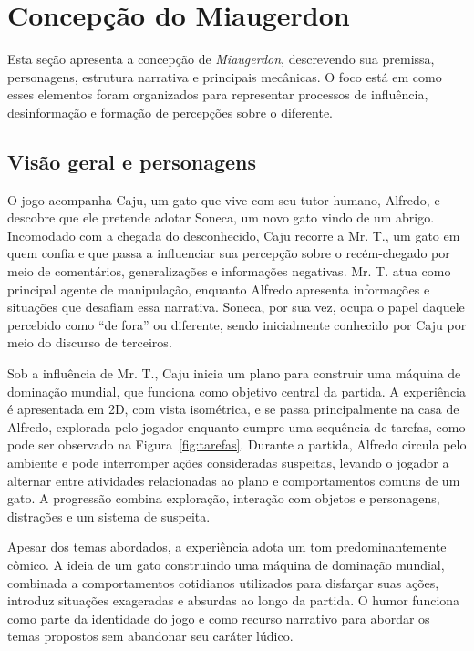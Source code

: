 \documentclass[12pt]{article}
\begin{document}
\section{Concepção do Miaugerdon}

Esta seção apresenta a concepção de \textit{Miaugerdon}, descrevendo sua premissa, personagens, estrutura narrativa e principais mecânicas. O foco está em como esses elementos foram organizados para representar processos de influência, desinformação e formação de percepções sobre o diferente.

\subsection{Visão geral e personagens}

O jogo acompanha Caju, um gato que vive com seu tutor humano, Alfredo, e descobre que ele pretende adotar Soneca, um novo gato vindo de um abrigo. Incomodado com a chegada do desconhecido, Caju recorre a Mr. T., um gato em quem confia e que passa a influenciar sua percepção sobre o recém-chegado por meio de comentários, generalizações e informações negativas. Mr. T. atua como principal agente de manipulação, enquanto Alfredo apresenta informações e situações que desafiam essa narrativa. Soneca, por sua vez, ocupa o papel daquele percebido como ``de fora'' ou diferente, sendo inicialmente conhecido por Caju por meio do discurso de terceiros.

Sob a influência de Mr. T., Caju inicia um plano para construir uma máquina de dominação mundial, que funciona como objetivo central da partida. A experiência é apresentada em 2D, com vista isométrica, e se passa principalmente na casa de Alfredo, explorada pelo jogador enquanto cumpre uma sequência de tarefas, como pode ser observado na Figura~\ref{fig:tarefas}. Durante a partida, Alfredo circula pelo ambiente e pode interromper ações consideradas suspeitas, levando o jogador a alternar entre atividades relacionadas ao plano e comportamentos comuns de um gato. A progressão combina exploração, interação com objetos e personagens, distrações e um sistema de suspeita.



Apesar dos temas abordados, a experiência adota um tom predominantemente cômico. A ideia de um gato construindo uma máquina de dominação mundial, combinada a comportamentos cotidianos utilizados para disfarçar suas ações, introduz situações exageradas e absurdas ao longo da partida. O humor funciona como parte da identidade do jogo e como recurso narrativo para abordar os temas propostos sem abandonar seu caráter lúdico.
\end{document}

